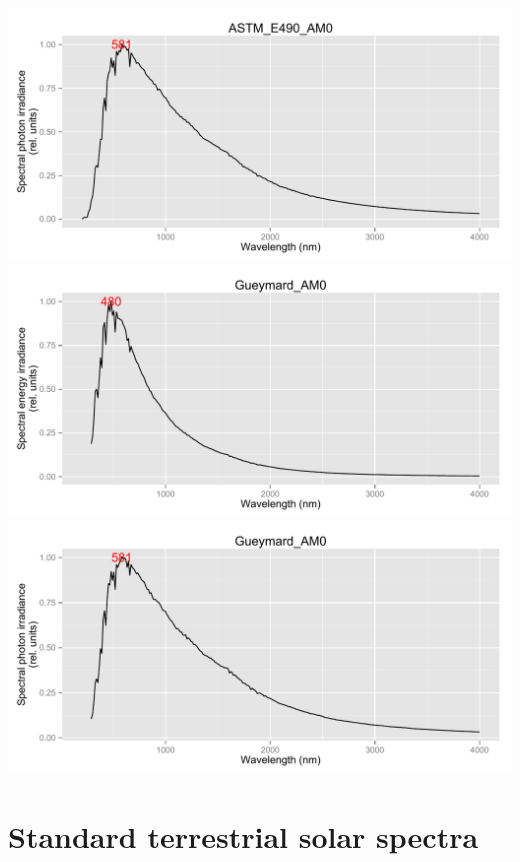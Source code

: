 \documentclass{article}\usepackage{knitr}
\begin{document}
\begin{knitrout}
{\includegraphics[width=.95\textwidth]{figure/pos-extraterrestrial4} 
\includegraphics[width=.95\textwidth]{figure/pos-extraterrestrial5} 
\includegraphics[width=.95\textwidth]{figure/pos-extraterrestrial6} 

}



\end{knitrout}

\section{Standard terrestrial solar spectra}
\end{document}
